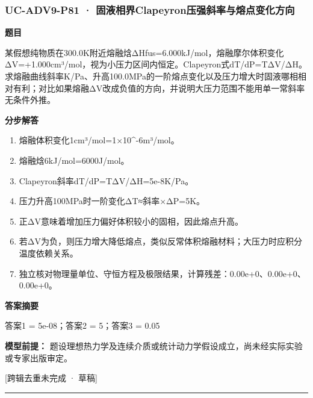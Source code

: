 \documentclass[UTF8,11pt,a4paper]{ctexart}
\begin{document}
\subsubsection*{UC-ADV9-P81 · 固液相界Clapeyron压强斜率与熔点变化方向}
\noindent\textbf{题目}\par
某假想纯物质在300.0K附近熔融焓ΔHfus=6.000kJ/mol，熔融摩尔体积变化ΔV=+1.000cm³/mol，视为小压力区间内恒定。Clapeyron式dT/dP=TΔV/ΔH。求熔融曲线斜率K/Pa、升高100.0MPa的一阶熔点变化以及压力增大时固液哪相相对有利；对比如果熔融ΔV改成负值的方向，并说明大压力范围不能用单一常斜率无条件外推。\par
\medskip\noindent\textbf{分步解答}
\begin{enumerate}
\item 熔融体积变化1cm³/mol=1×10\textasciicircum{}-6m³/mol。
\item 熔融焓6kJ/mol=6000J/mol。
\item Clapeyron斜率dT/dP=TΔV/ΔH=5e-8K/Pa。
\item 压力升高100MPa时一阶变化ΔT≈斜率×ΔP=5K。
\item 正ΔV意味着增加压力偏好体积较小的固相，因此熔点升高。
\item 若ΔV为负，则压力增大降低熔点，类似反常体积熔融材料；大压力时应积分温度依赖关系。
\item 独立核对物理量单位、守恒方程及极限结果，计算残差：0.00e+0、0.00e+0、0.00e+0。
\end{enumerate}
\noindent\textbf{答案摘要}\par
答案1 = 5e-08；答案2 = 5；答案3 = 0.05\par
\noindent\textbf{模型前提：}
题设理想热力学及连续介质或统计动力学假设成立，尚未经实际实验或专家出版审定。\par
\noindent\textcolor{red!65!black}{[跨辑去重未完成 · 草稿]} \par
\medskip\hrule\medskip
{}
\end{document}
